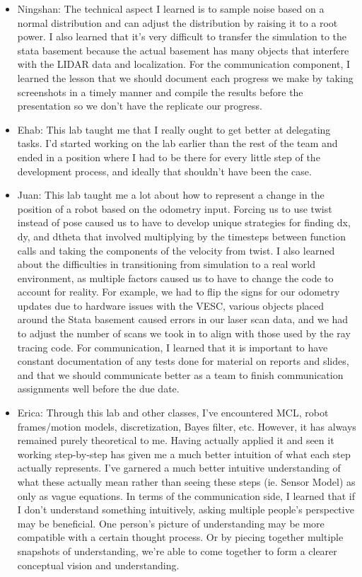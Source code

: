 \documentclass[11pt,twocolumn]{article}
\begin{document}
\begin{itemize}
    \item Ningshan: The technical aspect I learned is to sample noise based on a normal distribution and can adjust the distribution by raising it to a root power. I also learned that it's very difficult to transfer the simulation to the stata basement because the actual basement has many objects that interfere with the LIDAR data and localization. For the communication component, I learned the lesson that we should document each progress we make by taking screenshots in a timely manner and compile the results before the presentation so we don't have the replicate our progress.
    \item Ehab: This lab taught me that I really ought to get better at delegating tasks. I'd started working on the lab earlier than the rest of the team and ended in a position where I had to be there for every little step of the development process, and ideally that shouldn't have been the case.
    \item Juan: This lab taught me a lot about how to represent a change in the position of a robot based on the odometry input. Forcing us to use twist instead of pose caused us to have to develop unique strategies for finding dx, dy, and dtheta that involved multiplying by the timesteps between function calls and taking the components of the velocity from twist. I also learned about the difficulties in transitioning from simulation to a real world environment, as multiple factors caused us to have to change the code to account for reality. For example, we had to flip the signs for our odometry updates due to hardware issues with the VESC, various objects placed around the Stata basement caused errors in our laser scan data, and we had to adjust the number of scans we took in to align with those used by the ray tracing code. For communication, I learned that it is important to have constant documentation of any tests done for material on reports and slides, and that we should communicate better as a team to finish communication assignments well before the due date. 
    \item Erica: Through this lab and other classes, I've encountered MCL, robot frames/motion models, discretization, Bayes filter, etc. However, it has always remained purely theoretical to me. Having actually applied it and seen it working step-by-step has given me a much better intuition of what each step actually represents. I've garnered a much better intuitive understanding of what these actually mean rather than seeing these steps (ie. Sensor Model) as only as vague equations. In terms of the communication side, I learned that if I don't understand something intuitively, asking multiple people's perspective may be beneficial. One person's picture of understanding may be more compatible with a certain thought process. Or by piecing together multiple snapshots of understanding, we're able to come together to form a clearer conceptual vision and understanding.
\end{itemize}
\end{document}
